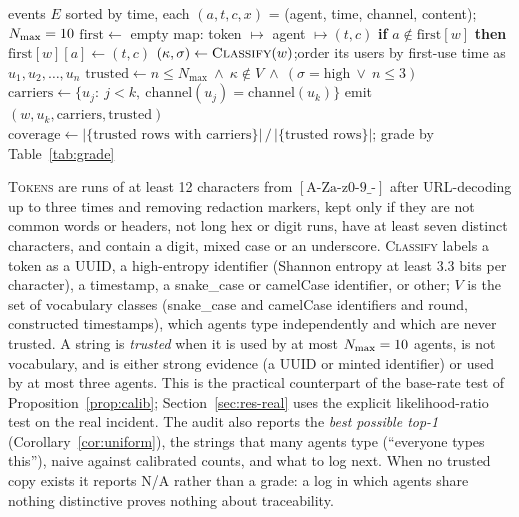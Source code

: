 \begin{algorithm}[t]
\caption{Calibrated copy detection}\label{alg:audit}
\begin{algorithmic}[1]
\Require events $E$ sorted by time, each $(a,t,c,x)$ = (agent, time, channel, content); $N_{\max}=10{}$
\State $\mathrm{first}\gets$ empty map: token $\mapsto$ agent $\mapsto (t,c)$
    \State \textbf{if} $a\notin\mathrm{first}[w]$ \textbf{then} $\mathrm{first}[w][a]\gets(t,c)$
  \EndFor
\EndFor
{}
  \State $(\kappa,\sigma)\gets\textsc{Classify}(w)$;\quad order its users by first-use time as $u_1,u_2,\dots,u_n$
  \State $\mathrm{trusted}\gets n\le N_{\max}\ \wedge\ \kappa\notin V\ \wedge\ (\sigma=\text{high}\ \vee\ n\le3)$
    \State $\mathrm{carriers}\gets\{u_j:\ j<k,\ \mathrm{channel}(u_j)=\mathrm{channel}(u_k)\}$
    \State emit $(w,u_k,\mathrm{carriers},\mathrm{trusted})$
  \EndFor
\EndFor
\State $\mathrm{coverage}\gets\big|\{\text{trusted rows with carriers}\}\big|\,/\,\big|\{\text{trusted rows}\}\big|$; grade by Table~\ref{tab:grade}
\end{algorithmic}
\end{algorithm}

\textsc{Tokens} are runs of at least 12 characters from $[\mathrm{A\text{-}Za\text{-}z0\text{-}9\_\text{-}}]$ after URL-decoding up to three times and removing redaction markers, kept only if they are not common words or headers, not long hex or digit runs, have at least seven distinct characters, and contain a digit, mixed case or an underscore. \textsc{Classify} labels a token as a UUID, a high-entropy identifier (Shannon entropy at least $3.3$ bits per character), a timestamp, a snake\_case or camelCase identifier, or other; $V$ is the set of vocabulary classes (snake\_case and camelCase identifiers and round, constructed timestamps), which agents type independently and which are never trusted. A string is \emph{trusted} when it is used by at most $N_{\max}=10{}$ agents, is not vocabulary, and is either strong evidence (a UUID or minted identifier) or used by at most three agents. This is the practical counterpart of the base-rate test of Proposition~\ref{prop:calib}; Section~\ref{sec:res-real} uses the explicit likelihood-ratio test on the real incident. The audit also reports the \emph{best possible top-1} (Corollary~\ref{cor:uniform}), the strings that many agents type (``everyone types this''), naive against calibrated counts, and what to log next. When no trusted copy exists it reports N/A rather than a grade: a log in which agents share nothing distinctive proves nothing about traceability.

